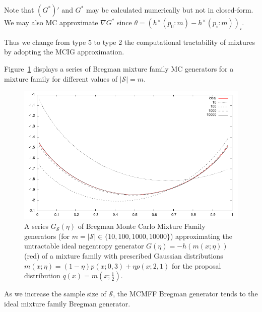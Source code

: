 \documentclass[graybox]{svmult}
\def\calS{\mathcal{S}}
\begin{document}
Note that $(G^*)'$ and $G^*$ may be calculated numerically but not in closed-form.
We may also MC approximate $\nabla G^*$ since $\theta=(h^\times(p_0:m)-h^\times(p_i:m))_i$.

Thus we change from type 5 to type 2 the computational tractability of mixtures by adopting the MCIG approximation. 

Figure~\ref{fig:mmgeneratorseq} displays a series of  Bregman mixture family MC generators for a mixture family for different values of $|\calS|=m$.


\begin{figure}%
\centering



\includegraphics[width=0.8\columnwidth]{plotMCG1.pdf}

\caption{A series $G_\calS(\eta)$ of Bregman Monte Carlo Mixture Family generators (for $m=|\calS|\in\{10,100,1000,10000\}$) approximating the untractable ideal negentropy generator $G(\eta)=-h(m(x;\eta))$ (red) of a  mixture family with prescribed Gaussian distributions $m(x;\eta)=(1-\eta)p(x;0,3)+\eta p(x;2,1)$ for the proposal distribution $q(x)=m(x;\frac{1}{2})$.
 }%
\label{fig:mmgeneratorseq}%
\end{figure}



%
%
%



As we increase the sample size of $\calS$, the MCMFF Bregman generator tends to the ideal mixture family Bregman generator.
\end{document}
